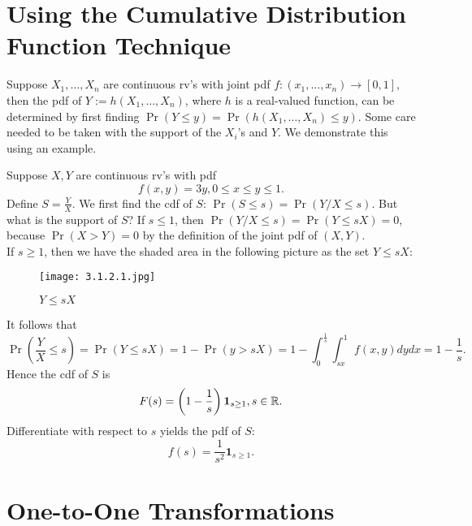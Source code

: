 \documentclass[11pt,fleqn]{book} %
\begin{document}

\section{Using the Cumulative Distribution Function Technique}

\begin{remark} \label{rmk:311}
Suppose \(X_1, \ldots, X_n\) are continuous rv's with joint pdf \(f:(x_1, \ldots, x_n)\rightarrow[0, 1]\), then the pdf of \(Y := h(X_1, \ldots, X_n)\), where \(h\) is a real-valued function, can be determined by first finding \(\Pr(Y \leq y) = \Pr(h(X_1, \ldots, X_n) \leq y)\). Some care needed to be taken with the support of the \(X_i\)'s and \(Y\). We demonstrate this using an example.
\end{remark}

\begin{example} \label{eg:312}
Suppose \(X, Y\) are continuous rv's with pdf
\[
f(x, y) = 3y, 0 \leq x \leq y \leq 1.
\]
\indent Define \(S = \frac Y X\). We first find the cdf of \(S\): \(\Pr(S \leq s) = \Pr(Y / X \leq s)\). But what is the support of \(S\)? If \(s \leq 1\), then \(\Pr(Y / X \leq s) = \Pr(Y \leq sX) = 0\), because \(\Pr(X > Y) = 0\) by the definition of the joint pdf of \((X, Y)\).\\
\indent If \(s \geq 1\), then we have the shaded area in the following picture as the set \(Y \leq sX\):
\begin{figure}[h]
\centering\texttt{[image: 3.1.2.1.jpg]}
\caption{\(Y \leq sX\)}
\label{fig:3121}
\end{figure}

\indent It follows that
\[
\Pr\left(\frac Y X \leq s\right) = \Pr(Y \leq sX) = 1 - \Pr(y > sX) = 1 - \int_0^{\frac{1}{s}}\int_{sx}^1 f(x, y)dydx = 1 - \frac{1}{s}.
\]
\indent Hence the cdf of \(S\) is
\[
F(s) = \left(1 - \frac{1}{s}\right)\mathbf{1}_{s \geq 1}, s \in \mathbb{R}.
\]
\indent Differentiate with respect to \(s\) yields the pdf of \(S\):
\[
f(s) = \frac{1}{s^2}\mathbf{1}_{s \geq 1}.
\]
\end{example}


\section{One-to-One Transformations}
\end{document}
